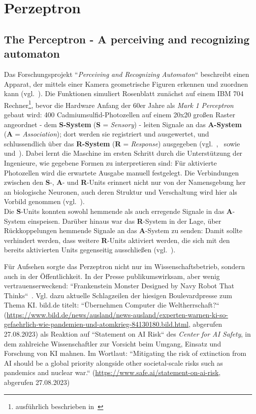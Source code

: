 {\section{Perzeptron}\label{appendix:perzeptron}
\subsection*{The Perceptron - A perceiving and recognizing automaton}
Das Forschungsprojekt ``\textit{Perceiving and Recognizing Automaton}`` beschreibt einen Apparat, der mittels einer Kamera geometrische Figuren erkennen und zuordnen kann (vgl.~\cite[3]{Ros57}).
Die Funktionen simuliert Rosenblatt zunächst auf einem IBM 704 Rechner\footnote{
    ausführlich beschrieben in~\cite{Ros60}
}, bevor  die Hardware Anfang der 60er Jahre als \textit{Mark 1 Perceptron} gebaut wird: 400 Cadmiumsulfid-Photozellen auf einem 20x20 großen Raster angeordnet - dem \textbf{S-System} (\textbf{S} = \textit{Sensory}) - leiten Signale an das \textbf{A-System} (\textbf{A} = \textit{Association}); dort werden sie registriert und ausgewertet, und schlussendlich über das \textbf{R-System} (\textbf{R} = \textit{Response}) ausgegeben (vgl.~\cite[4 f.]{Ros57},~\cite[389 f.]{Ros58} sowie~\cite[193, ``Frank Rosenblatt]{Bis06} und~\cite[196, Figure 4.8]{Bis06}).
Dabei lernt die Maschine im ersten Schritt durch die Unterstützung der Ingenieure, wie gegebene Formen zu interpretieren sind: Für aktivierte Photozellen wird die erwartete Ausgabe manuell festgelegt.
Die Verbindungen zwischen den \textbf{S}-, \textbf{A}- und \textbf{R}-Units erinnert nicht nur von der Namensgebung her an biologische Neuronen, auch deren Struktur und Verschaltung wird hier als Vorbild genommen (vgl.~\cite[4]{Ros62}).\\

Die \textbf{S}-Units konnten sowohl hemmende als auch erregende Signale in das \textbf{A}-System einspeisen.
Darüber hinaus war das \textbf{R}-System in der Lage, über Rückkoppelungen hemmende Signale an das \textbf{A}-System zu senden: Damit sollte verhindert werden, dass weitere \textbf{R}-Units aktiviert werden, die sich mit den bereits aktivierten Units gegenseitig ausschließen (vgl.~\cite[4 f.]{Ros57}).

Für Aufsehen sorgte das Perzeptron nicht nur im Wissenschaftsbetrieb, sondern auch in der Öffentlichkeit.
In der Presse publikumswirksam, aber wenig vertrauenserweckend: ``Frankenstein Monster Designed by Navy Robot That Thinks``~\cite[v]{Ros62}. Vgl. dazu aktuelle Schlagzeilen der hiesigen Boulevardpresse zum Thema KI. bild.de titelt: ``Übernehmen Computer die Weltherrschaft{?}`` (\url{https://www.bild.de/news/ausland/news-ausland/experten-warnen-ki-so-gefaehrlich-wie-pandemien-und-atomkrieg-84130180.bild.html}, abgerufen 27.08.2023) als Reaktion auf ``Statement on AI Risk`` des \textit{Center for AI Safety}, in dem zahlreiche Wissenschaftler zur Vorsicht beim Umgang, Einsatz und Forschung von KI mahnen.
Im Wortlaut: ``Mitigating the risk of extinction from AI should be a global priority alongside other societal-scale risks such as pandemics and nuclear war.`` (\url{https://www.safe.ai/statement-on-ai-risk}, abgerufen 27.08.2023)


}
